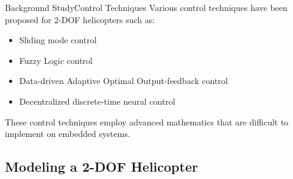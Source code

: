 \documentclass{beamer}
\begin{document}
\begin{frame}{Background Study}{Control Techniques}
    Various control techniques have been proposed for 2-DOF helicopters such as:
    \begin{itemize}
        \item Sliding mode control \cite{Ahmed2010-Sliding} %
        \item Fuzzy Logic control 
        \cite{Chang2017-Fuzzy}
        \cite{Kayacan2016-Fuzzy}
        \cite{Mendez-Monroy2012-Fuzzy} 
        \item Data-driven Adaptive Optimal Output-feedback control \cite{Gao2016-DataDriven} %
        \item Decentralized discrete-time neural control \cite{Hernandez-Gonzalez2012-Decentralized} %
    \end{itemize}
    These control techniques employ advanced mathematics that are difficult to implement on embedded systems.
\end{frame}


\subsection{Modeling a 2-DOF Helicopter}
\end{document}

